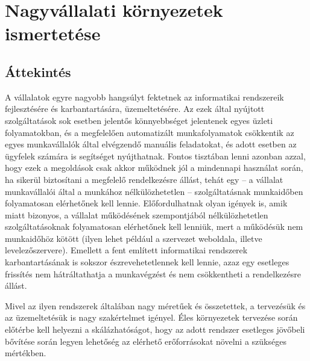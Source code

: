 

\chapter{Nagyvállalati környezetek ismertetése}

\section{Áttekintés}
A vállalatok egyre nagyobb hangsúlyt fektetnek az informatikai rendszereik fejlesztésére és karbantartására, üzemeltetésére. Az ezek által nyújtott szolgáltatások sok esetben jelentős könnyebbséget jelentenek egyes üzleti folyamatokban, és a megfelelően automatizált munkafolyamatok csökkentik az egyes munkavállalók által elvégzendő manuális feladatokat, és adott esetben az ügyfelek számára is segítséget nyújthatnak. Fontos tisztában lenni azonban azzal, hogy ezek a megoldások csak akkor működnek jól a mindennapi használat során, ha sikerül biztosítani a megfelelő rendelkezésre állást, tehát egy -- a vállalat munkavállalói által a munkához nélkülözhetetlen -- szolgáltatásnak munkaidőben folyamatosan elérhetőnek kell lennie. Előfordulhatnak olyan igények is, amik miatt bizonyos, a vállalat működésének szempontjából nélkülözhetetlen szolgáltatásoknak folyamatosan elérhetőnek kell lenniük, mert a működésük nem munkaidőhöz kötött (ilyen lehet például a szervezet weboldala, illetve levelezőszervere).  Emellett a fent említett informatikai rendszerek karbantartásának is sokszor észrevehetetlennek kell lennie, azaz egy esetleges frissítés nem hátráltathatja a munkavégzést és nem csökkentheti a rendelkezésre állást.

Mivel az ilyen rendszerek általában nagy méretűek és összetettek, a tervezésük és az üzemeltetésük is nagy szakértelmet igényel. Éles környezetek tervezése során előtérbe kell helyezni a skálázhatóságot, hogy az adott rendszer esetleges jövőbeli bővítése során legyen lehetőség az elérhető erőforrásokat növelni a szükséges mértékben.



